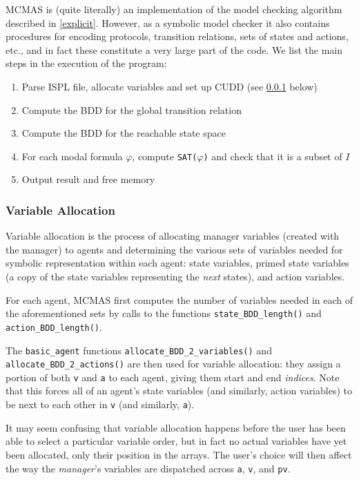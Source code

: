 \documentclass[11pt]{article}
\begin{document}
MCMAS is (quite literally) an implementation of the model checking algorithm described in \ref{explicit}. However, as a symbolic model checker it also contains procedures for encoding protocols, transition relations, sets of states and actions, etc., and in fact these constitute a very large part of the code. 
We list the main steps in the execution of the program:
\begin{enumerate}
\item Parse ISPL file, allocate variables and set up CUDD (see \ref{variable_allocation} below)
\item Compute the BDD for the global transition relation
\item Compute the BDD for the reachable state space 
\item For each modal formula $\varphi$, compute
\texttt{SAT($\varphi$)} and check that it is a subset of $I$
\item Output result and free memory
\end{enumerate}


\subsubsection{Variable Allocation}
\label{variable_allocation}
Variable allocation is the process of allocating manager variables (created with the manager) to agents and determining the various sets of variables needed for symbolic representation within each agent: state variables, primed state variables (a copy of the state variables representing the \textit{next }states), and action variables.

For each agent, MCMAS first computes the number of variables needed in each of the aforementioned sets by calls to the functions \texttt{state\_BDD\_length()} and \texttt{action\_BDD\_length()}.

The \texttt{basic\_agent} functions \texttt{allocate\_BDD\_2\_variables()} and \texttt{allocate\_BDD\_2\_actions()} are then used for variable allocation: they assign a portion of both \texttt{v} and \texttt{a} to each agent, giving them start and end \textit{indices}. Note that this forces all of an agent's state variables (and similarly, action variables) to be next to each other in \texttt{v} (and similarly, \texttt{a}). 

It may seem confusing that variable allocation happens before the user has been able to select a particular variable order, but in fact no actual variables have yet been allocated, only their position in the arrays. The user's choice will then affect the way the \textit{manager}'s variables are dispatched across \texttt{a}, \texttt{v}, and \texttt{pv}. 
\end{document}

